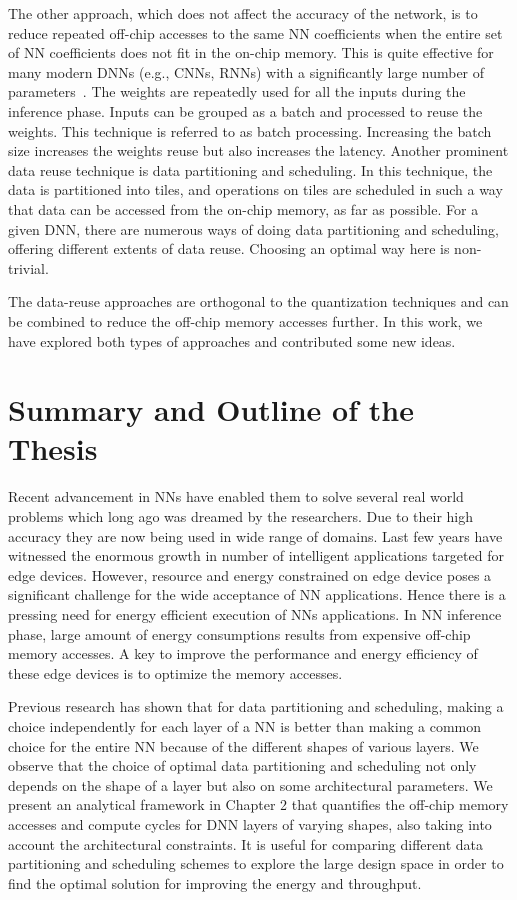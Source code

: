 The other approach, which does not affect the accuracy of the network, is to reduce repeated off-chip accesses to the same NN coefficients when the entire set of NN coefficients does not fit in the on-chip memory. This is quite effective for many modern DNNs (e.g., CNNs, RNNs) with a significantly large number of parameters~\cite{zhang2015optimizing,Li2018SmartShuttleOO,que2019efficient,park2020time}. The weights are repeatedly used for all the inputs during the inference phase. Inputs can be grouped as a batch and processed to reuse the weights. This technique is referred to as batch processing. Increasing the batch size increases the weights reuse but also increases the latency. Another prominent data reuse technique is data partitioning and scheduling. In this technique, the data is partitioned into tiles, and operations on tiles are scheduled in such a way that data can be accessed from the on-chip memory, as far as possible. For a given DNN, there are numerous ways of doing data partitioning and scheduling, offering different extents of data reuse. Choosing an optimal way here is non-trivial.

The data-reuse approaches are orthogonal to the quantization techniques and can be combined to reduce the off-chip memory accesses further. In this work, we have explored both types of approaches and contributed some new ideas.

\section{Summary and Outline of the Thesis} 
Recent advancement in NNs have enabled them to solve several real world problems which long ago was dreamed by the researchers. Due to their high accuracy they are now being used in wide range of domains. Last few years have witnessed the enormous growth in number of intelligent applications targeted for edge devices. However, resource and energy constrained on edge device poses a significant challenge for the wide acceptance of NN applications. Hence there is a pressing need for energy efficient execution of NNs applications. In NN inference phase, large amount of energy consumptions results from expensive off-chip memory accesses. A key to improve the performance and energy efficiency of these edge devices is to optimize the memory accesses.
 
Previous research has shown that for data partitioning and scheduling, making a choice independently for each layer of a NN is better than making a common choice for the entire NN because of the different shapes of various layers. We observe that the choice of optimal data partitioning and scheduling not only depends on the shape of a layer but also on some architectural parameters. We present an analytical framework in Chapter 2 that quantifies the off-chip memory accesses and compute cycles for DNN layers of varying shapes, also taking into account the architectural constraints. It is useful for comparing different data partitioning and scheduling schemes to explore the large design space in order to find the optimal solution for improving the energy and throughput. 

